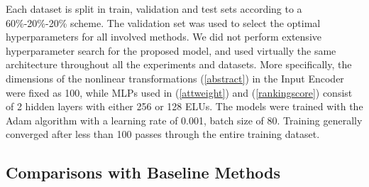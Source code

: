 \documentclass[letterpaper]{article} %
\begin{document}
Each dataset is split in train, validation and test sets according to a 60\%-20\%-20\% scheme. The validation set was used to select the optimal hyperparameters for all involved methods. We did not perform extensive hyperparameter search for the proposed model, and used virtually the same architecture throughout all the experiments and datasets. More specifically, the dimensions of the nonlinear transformations (\ref{abstract}) in the Input Encoder were fixed as 100, while MLPs used in (\ref{attweight}) and (\ref{rankingscore}) consist of 2 hidden layers with either 256 or 128 ELUs. The models were trained with the Adam algorithm \cite{kingma2014adam} with a learning rate of 0.001, batch size of 80. Training generally converged after less than 100 passes through the entire training dataset.

\subsection{Comparisons with Baseline Methods}
\end{document}
